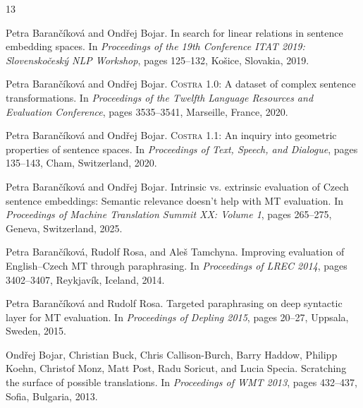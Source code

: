 \documentclass[12pt,a4paper]{report}
\begin{document}


\renewcommand{\bibname}{Bibliography}
\begin{thebibliography}{13}
\small

Petra Barančíková and Ondřej Bojar.
\newblock In search for linear relations in sentence embedding spaces.
\newblock In \emph{Proceedings of the 19th Conference ITAT 2019: Slovenskočeský NLP Workshop}, pages 125--132, Košice, Slovakia, 2019.

Petra Barančíková and Ondřej Bojar.
\newblock \textsc{Costra} 1.0: A dataset of complex sentence transformations.
\newblock In \emph{Proceedings of the Twelfth Language Resources and Evaluation Conference}, pages 3535--3541, Marseille, France, 2020.

Petra Barančíková and Ondřej Bojar.
\newblock \textsc{Costra} 1.1: An inquiry into geometric properties of sentence spaces.
\newblock In \emph{Proceedings of Text, Speech, and Dialogue}, pages 135--143, Cham, Switzerland, 2020.

Petra Barančíková and Ondřej Bojar.
\newblock Intrinsic vs. extrinsic evaluation of Czech sentence embeddings: Semantic relevance doesn't help with MT evaluation.
\newblock In \emph{Proceedings of Machine Translation Summit XX: Volume 1}, pages 265--275, Geneva, Switzerland, 2025.

Petra Barančíková, Rudolf Rosa, and Aleš Tamchyna.
\newblock Improving evaluation of English--Czech MT through paraphrasing.
\newblock In \emph{Proceedings of LREC 2014}, pages 3402--3407, Reykjavík, Iceland, 2014.

Petra Barančíková and Rudolf Rosa.
\newblock Targeted paraphrasing on deep syntactic layer for MT evaluation.
\newblock In \emph{Proceedings of Depling 2015}, pages 20--27, Uppsala, Sweden, 2015.

Ondřej Bojar, Christian Buck, Chris Callison-Burch, Barry Haddow, Philipp Koehn, Christof Monz, Matt Post, Radu Soricut, and Lucia Specia.
\newblock Scratching the surface of possible translations.
\newblock In \emph{Proceedings of WMT 2013}, pages 432--437, Sofia, Bulgaria, 2013.



\end{thebibliography}
\end{document}
